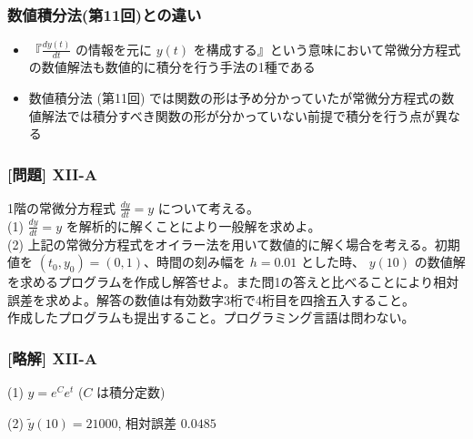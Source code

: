 \documentclass[dvipdfmx,aspectratio=169,20pt]{beamer}
\newcommand{\myfontsetting}[3]{{\fontsize{#1}{#2}\selectfont #3}}
\begin{document}
\begin{frame}
\frametitle{\myfontsetting{28pt}{28pt}{数値積分法\myfontsetting{18pt}{18pt}{(第11回)}との違い}}
\begin{itemize}
    \setlength{\itemsep}{0.15cm}
    \item \myfontsetting{15pt}{15pt}{『$\frac{dy(t)}{dt}$ の情報を元に $y(t)$ を構成する』という意味において常微分方程式の数値解法も数値的に積分を行う手法の1種である}
    \item \myfontsetting{15pt}{15pt}{
        数値積分法 (第11回) では関数の形は予め分かっていたが常微分方程式の数値解法では積分すべき関数の形が分かっていない前提で積分を行う点が異なる}
\end{itemize}
\end{frame}
\begin{frame}
\frametitle{[問題] X\hspace{-.1em}I\hspace{-.1em}I-A}


\myfontsetting{15pt}{18pt}{
1階の常微分方程式 $\frac{dy}{dt}=y$ について考える。\\
(1) $\frac{dy}{dt}=y$ を解析的に解くことにより一般解を求めよ。\\
(2) 上記の常微分方程式をオイラー法を用いて数値的に解く場合を考える。初期値を $(t_0,y_0)=(0,1)$、時間の刻み幅を $h=0.01$ とした時、 $y(10)$ の数値解を求めるプログラムを作成し解答せよ。また問1の答えと比べることにより相対誤差を求めよ。解答の数値は有効数字3桁で4桁目を四捨五入すること。
}\\
\myfontsetting{12pt}{12pt}{
作成したプログラムも提出すること。プログラミング言語は問わない。
}
\end{frame}
\begin{frame}
\frametitle{[略解] X\hspace{-.1em}I\hspace{-.1em}I-A}
(1) $y=e^C e^t$ ($C$ は積分定数)

\vspace{0.5cm}

(2) $\tilde{y}(10)=21000$, 相対誤差 $0.0485$
\end{frame}
\end{document}
